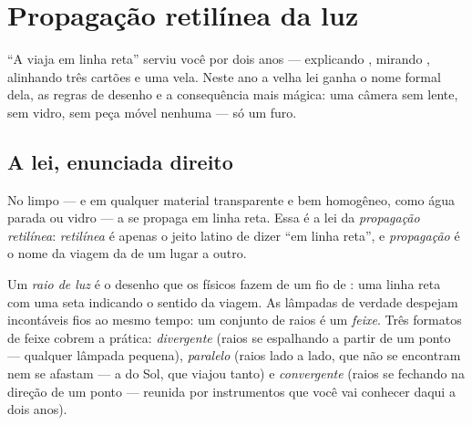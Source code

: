 \chapter{Propagação retilínea da luz}\label{ch:g6:light-propagation}

``A  viaja em linha reta'' serviu você por dois anos --- explicando
, mirando , alinhando três cartões e uma vela. Neste
ano a velha lei ganha o nome formal dela, as regras de desenho e a
consequência mais mágica: uma câmera sem lente, sem vidro, sem peça
móvel nenhuma --- só um furo.

\section{A lei, enunciada direito}

\begin{proposition}\label{prop:g6:light-propagation:law}
No  limpo --- e em qualquer material transparente e bem homogêneo,
como água parada ou vidro --- a  se propaga em linha reta. Essa é
a lei da \emph{propagação retilínea}:
\emph{retilínea} é apenas o jeito latino de dizer ``em linha reta'',
e \emph{propagação} é o nome da viagem da  de um lugar a outro.
\end{proposition}

\begin{definition}\label{def:g6:light-propagation:ray}
Um \emph{raio de luz} é o desenho que os físicos
fazem de um fio de : uma linha reta com uma seta indicando o
sentido da viagem. As lâmpadas de verdade despejam incontáveis fios
ao mesmo tempo: um conjunto de raios é um \emph{feixe}.
Três formatos de feixe cobrem a prática: \emph{divergente} (raios se
espalhando a partir de um ponto --- qualquer lâmpada pequena),
\emph{paralelo} (raios lado a lado, que não se encontram nem se
afastam --- a  do Sol, que viajou tanto) e \emph{convergente}
(raios se fechando na direção de um ponto ---  reunida por
instrumentos que você vai conhecer daqui a dois anos).
\end{definition}

